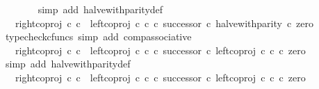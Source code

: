\begin{isabellebody}
\ \ \ \ \ \ \isamarkupfalse%
\ {\isacharparenleft}{\kern0pt}simp\ add{\isacharcolon}{\kern0pt}\ halve{\isacharunderscore}{\kern0pt}with{\isacharunderscore}{\kern0pt}parity{\isacharunderscore}{\kern0pt}def{}{\isacharparenright}{\kern0pt}\isanewline
\ \ \ \ \isamarkupfalse%
\ \isamarkupfalse%
\ {\isachardoublequoteopen}{\isachardot}{\kern0pt}{\isachardot}{\kern0pt}{\isachardot}{\kern0pt}\ {\isacharequal}{\kern0pt}\ right{\isacharunderscore}{\kern0pt}coproj\ {\isasymnat}\isactrlsub c\ {\isasymnat}\isactrlsub c\ {\isasymamalg}\ {\isacharparenleft}{\kern0pt}left{\isacharunderscore}{\kern0pt}coproj\ {\isasymnat}\isactrlsub c\ {\isasymnat}\isactrlsub c\ {\isasymcirc}\isactrlsub c\ successor{\isacharparenright}{\kern0pt}\ {\isasymcirc}\isactrlsub c\ halve{\isacharunderscore}{\kern0pt}with{\isacharunderscore}{\kern0pt}parity\ {\isasymcirc}\isactrlsub c\ zero{\isachardoublequoteclose}\isanewline
\ \ \ \ \ \ \isamarkupfalse%
\ {\isacharparenleft}{\kern0pt}typecheck{\isacharunderscore}{\kern0pt}cfuncs{\isacharcomma}{\kern0pt}\ simp\ add{\isacharcolon}{\kern0pt}\ comp{\isacharunderscore}{\kern0pt}associative{}{\isacharparenright}{\kern0pt}\isanewline
\ \ \ \ \isamarkupfalse%
\ \isamarkupfalse%
\ {\isachardoublequoteopen}{\isachardot}{\kern0pt}{\isachardot}{\kern0pt}{\isachardot}{\kern0pt}\ {\isacharequal}{\kern0pt}\ right{\isacharunderscore}{\kern0pt}coproj\ {\isasymnat}\isactrlsub c\ {\isasymnat}\isactrlsub c\ {\isasymamalg}\ {\isacharparenleft}{\kern0pt}left{\isacharunderscore}{\kern0pt}coproj\ {\isasymnat}\isactrlsub c\ {\isasymnat}\isactrlsub c\ {\isasymcirc}\isactrlsub c\ successor{\isacharparenright}{\kern0pt}\ {\isasymcirc}\isactrlsub c\ left{\isacharunderscore}{\kern0pt}coproj\ {\isasymnat}\isactrlsub c\ {\isasymnat}\isactrlsub c\ {\isasymcirc}\isactrlsub c\ zero{\isachardoublequoteclose}\isanewline
\ \ \ \ \ \ \isamarkupfalse%
\ {\isacharparenleft}{\kern0pt}simp\ add{\isacharcolon}{\kern0pt}\ halve{\isacharunderscore}{\kern0pt}with{\isacharunderscore}{\kern0pt}parity{\isacharunderscore}{\kern0pt}def{}{\isacharparenright}{\kern0pt}\isanewline
\ \ \ \ \isamarkupfalse%
\ \isamarkupfalse%
\ {\isachardoublequoteopen}{\isachardot}{\kern0pt}{\isachardot}{\kern0pt}{\isachardot}{\kern0pt}\ {\isacharequal}{\kern0pt}\ {\isacharparenleft}{\kern0pt}right{\isacharunderscore}{\kern0pt}coproj\ {\isasymnat}\isactrlsub c\ {\isasymnat}\isactrlsub c\ {\isasymamalg}\ {\isacharparenleft}{\kern0pt}left{\isacharunderscore}{\kern0pt}coproj\ {\isasymnat}\isactrlsub c\ {\isasymnat}\isactrlsub c\ {\isasymcirc}\isactrlsub c\ successor{\isacharparenright}{\kern0pt}\ {\isasymcirc}\isactrlsub c\ left{\isacharunderscore}{\kern0pt}coproj\ {\isasymnat}\isactrlsub c\ {\isasymnat}\isactrlsub c{\isacharparenright}{\kern0pt}\ {\isasymcirc}\isactrlsub c\ zero{\isachardoublequoteclose}\isanewline

\end{isabellebody}
